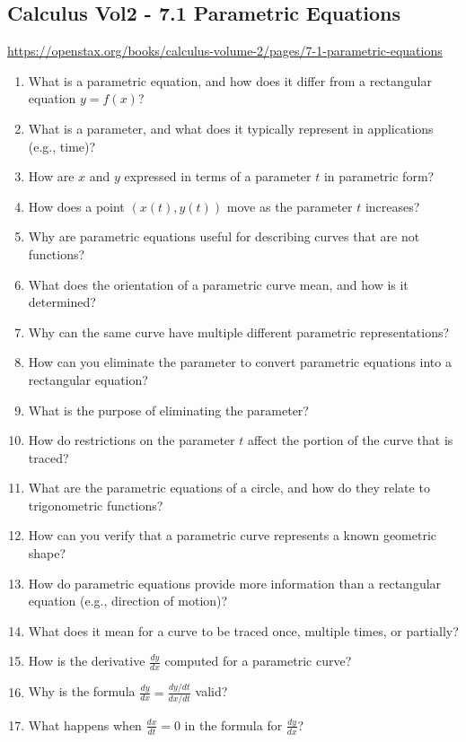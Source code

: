 \subsection{Calculus Vol2 - 7.1 Parametric Equations}

\url{https://openstax.org/books/calculus-volume-2/pages/7-1-parametric-equations}

\begin{enumerate}
  \item What is a parametric equation, and how does it differ from a rectangular equation \(y=f(x)\)?
  \item What is a parameter, and what does it typically represent in applications (e.g., time)?
  \item How are \(x\) and \(y\) expressed in terms of a parameter \(t\) in parametric form?
  \item How does a point \((x(t), y(t))\) move as the parameter \(t\) increases?
  \item Why are parametric equations useful for describing curves that are not functions?
  \item What does the orientation of a parametric curve mean, and how is it determined?
  \item Why can the same curve have multiple different parametric representations?
  \item How can you eliminate the parameter to convert parametric equations into a rectangular equation?
  \item What is the purpose of eliminating the parameter?
  \item How do restrictions on the parameter \(t\) affect the portion of the curve that is traced?
  \item What are the parametric equations of a circle, and how do they relate to trigonometric functions?
  \item How can you verify that a parametric curve represents a known geometric shape?
  \item How do parametric equations provide more information than a rectangular equation (e.g., direction of motion)?
  \item What does it mean for a curve to be traced once, multiple times, or partially?
  \item How is the derivative \(\frac{dy}{dx}\) computed for a parametric curve?
  \item Why is the formula \(\frac{dy}{dx}= \frac{dy/dt}{dx/dt}\) valid?
  \item What happens when \(\frac{dx}{dt}= 0\) in the formula for \(\frac{dy}{dx}\)?

\end{enumerate}

